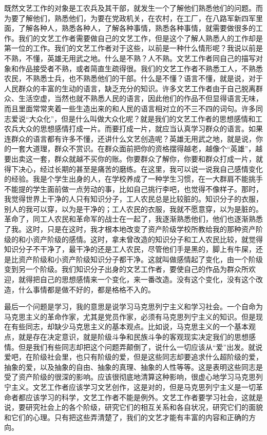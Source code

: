 既然文艺工作的对象是工农兵及其干部，就发生一个了解他们熟悉他们的问题。而为要了解他们，熟悉他们，为要在党政机关，在农村，在工厂，在八路军新四军里面，了解各种人，熟悉各种人，了解各种事情，熟悉各种事情，就需要做很多的工作。我们的文艺工作者需要做自己的文艺工作，但是这个了解人熟悉人的工作却是第一位的工作。我们的文艺工作者对于这些，以前是一种什么情形呢？我说以前是不熟，不懂，英雄无用武之地。什么是不熟？人不熟。文艺工作者同自己的描写对象和作品接受者不熟，或者简直生疏得很。我们的文艺工作者不熟悉工人，不熟悉农民，不熟悉士兵，也不熟悉他们的干部。什么是不懂？语言不懂，就是说，对于人民群众的丰富的生动的语言，缺乏充分的知识。许多文艺工作者由于自己脱离群众、生活空虚，当然也就不熟悉人民的语言，因此他们的作品不但显得语言无味，而且里面常常夹着一些生造出来的和人民的语言相对立的不三不四的词句。许多同志爱说“大众化”，但是什么叫做大众化呢？就是我们的文艺工作者的思想感情和工农兵大众的思想感情打成一片。而要打成一片，就应当认真学习群众的语言。如果连群众的语言都有许多不懂，还讲什么文艺创造呢？英雄无用武之地，就是说，你的一套大道理，群众不赏识。在群众面前把你的资格摆得越老，越像个“英雄”，越要出卖这一套，群众就越不买你的账。你要群众了解你，你要和群众打成一片，就得下决心，经过长期的甚至是痛苦的磨练。在这里，我可以说一说我自己感情变化的经验。我是个学生出身的人，在学校养成了一种学生习惯，在一大群肩不能挑手不能提的学生面前做一点劳动的事，比如自己挑行李吧，也觉得不像样子。那时，我觉得世界上干净的人只有知识分子，工人农民总是比较脏的。知识分子的衣服，别人的我可以穿，以为是干净的；工人农民的衣服，我就不愿意穿，以为是脏的。革命了，同工人农民和革命军的战士在一起了，我逐渐熟悉他们，他们也逐渐熟悉了我。这时，只是在这时，我才根本地改变了资产阶级学校所教给我的那种资产阶级的和小资产阶级的感情。这时，拿未曾改造的知识分子和工人农民比较，就觉得知识分子不干净了，最干净的还是工人农民，尽管他们手是黑的，脚上有牛屎，还是比资产阶级和小资产阶级知识分子都干净。这就叫做感情起了变化，由一个阶级变到另一个阶级。我们知识分子出身的文艺工作者，要使自己的作品为群众所欢迎，就得把自己的思想感情来一个变化，来一番改造。没有这个变化，没有这个改造，什么事情都是做不好的，都是格格不入的。

最后一个问题是学习，我的意思是说学习马克思列宁主义和学习社会。一个自命为马克思主义的革命作家，尤其是党员作家，必须有马克思列宁主义的知识。但是现在有些同志，却缺少马克思主义的基本观点。比如说，马克思主义的一个基本观点，就是存在决定意识，就是阶级斗争和民族斗争的客观现实决定我们的思想感情。但是我们有些同志却把这个问题弄颠倒了，说什么一切应该从“爱”出发。就说爱吧，在阶级社会里，也只有阶级的爱，但是这些同志却要追求什么超阶级的爱，抽象的爱，以及抽象的自由、抽象的真理、抽象的人性等等。这是表明这些同志是受了资产阶级的很深的影响。应该很彻底地清算这种影响，很虚心地学习马克思列宁主义。文艺工作者应该学习文艺创作，这是对的，但是马克思列宁主义是一切革命者都应该学习的科学，文艺工作者不能是例外。文艺工作者要学习社会，这就是说，要研究社会上的各个阶级，研究它们的相互关系和各自状况，研究它们的面貌和它们的心理。只有把这些弄清楚了，我们的文艺才能有丰富的内容和正确的方向。

